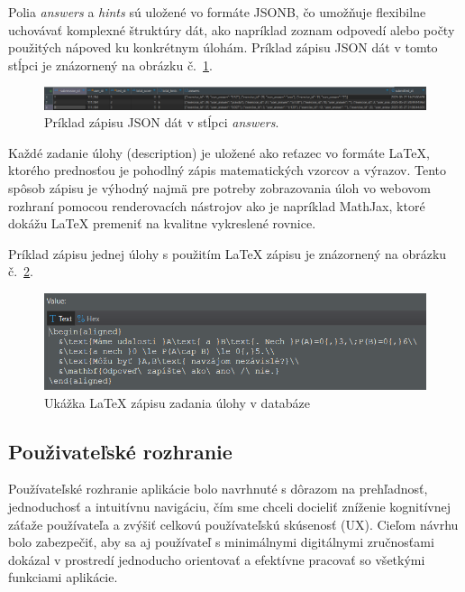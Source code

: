 Polia \textit{answers} a \textit{hints} sú uložené vo formáte JSONB, čo umožňuje flexibilne uchovávať komplexné štruktúry dát, ako napríklad zoznam odpovedí alebo počty použitých nápoved ku konkrétnym úlohám.
 Príklad zápisu JSON dát v tomto stĺpci je znázornený na obrázku č.~\ref{dbjsonb}.

 \begin{figure}[h!]
  \centering
  \includegraphics[width=\textwidth]{img/dbjsonb.png}
  \caption{Príklad zápisu JSON dát v stĺpci \textit{answers}.}
  \label{dbjsonb}
 \end{figure}

 Každé zadanie úlohy (description) je uložené ako reťazec vo formáte LaTeX, ktorého prednosťou je pohodlný zápis matematických vzorcov a výrazov. Tento spôsob zápisu je výhodný najmä pre potreby zobrazovania úloh vo webovom rozhraní pomocou renderovacích nástrojov ako je napríklad MathJax, ktoré dokážu LaTeX premeniť na kvalitne vykreslené rovnice.

Príklad zápisu jednej úlohy s použitím LaTeX zápisu je znázornený na obrázku č.~\ref{latexpriklad}.

\begin{figure}[H]
  \centering
  \includegraphics[width=\textwidth]{img/latex_example.png}
  \caption{Ukážka LaTeX zápisu zadania úlohy v databáze}
  \label{latexpriklad}
\end{figure}


\subsection{Použivateľské rozhranie}

Používateľské rozhranie aplikácie bolo navrhnuté s dôrazom na prehľadnosť, jednoduchosť a intuitívnu navigáciu, čím sme chceli docieliť zníženie kognitívnej záťaže používateľa a zvýšiť celkovú používateľskú skúsenosť (UX). Cieľom návrhu bolo zabezpečiť, aby sa aj používateľ s minimálnymi digitálnymi zručnosťami dokázal v prostredí jednoducho orientovať a efektívne pracovať so všetkými funkciami aplikácie.

